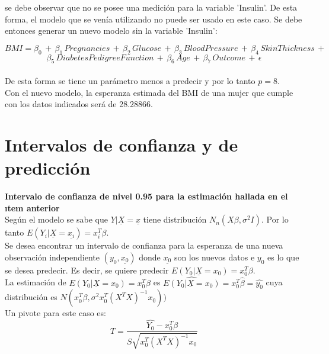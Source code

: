 \documentclass{article}
\begin{document}
\noindent
se debe observar que no se posee una medición para la variable 'Insulin'. De esta forma, el modelo que se venía utilizando no puede ser usado en este caso. Se debe entonces generar un nuevo modelo sin la variable 'Insulin':

$$BMI = \beta_0 \, + \, \beta_1 \, Pregnancies \, + \, \beta_2 \, Glucose \, + \, \beta_3 \, BloodPressure \, + \, \beta_4 \, SkinThickness \, + $$
$$\beta_5 \, DiabetesPedigreeFunction \, + \, \beta_6 \, Age \, + \, \beta_7 \, Outcome \, + \, \epsilon $$\\

\noindent 
De esta forma se tiene un parámetro menos a predecir y por lo tanto \(p = 8 \).\\

\noindent
Con el nuevo modelo, la esperanza estimada del BMI de una mujer que cumple con los datos indicados será de 28.28866.







\section{Intervalos de confianza y de predicción}
\textbf{Intervalo de confianza de nivel 0.95 para la estimación hallada en el ıtem anterior}\\

\noindent
Según el modelo se sabe que \(Y|\underline{X}=\underline{x}\) tiene distribución \(N_n(X \beta, \sigma^2 I)\). Por lo tanto \(E(Y_i|\underline{X}=\underline{x_i}) = x_i^T \beta\).\\

\noindent
Se desea encontrar un intervalo de confianza para la esperanza de una nueva observación independiente \((y_0, \underline{x_0})\) donde \(\underline{x_0}\) son los nuevos datos e \(y_0\) es lo que se desea predecir. Es decir, se quiere predecir \(E(Y_0|\underline{X}=x_0) = x_0^T \beta\).\\

\noindent
La estimación de \(E(Y_0|\underline{X}=x_0) = x_0^T \beta\) es \(\widehat{E(Y_0|\underline{X}=x_0)} = x_0^T \hat{\beta} = \hat{y_0}\) cuya distribución es \(N(x_0^T \beta, \sigma ^2 x_0^T (X^T X)^{-1}x_0))\)\\

\noindent
Un pivote para este caso es:\\

$$T = \frac{\hat{Y_0} - x_0^T \beta}{S \sqrt{x_0^T (X^T X)^{-1} x_0}}$$\\
\end{document}
